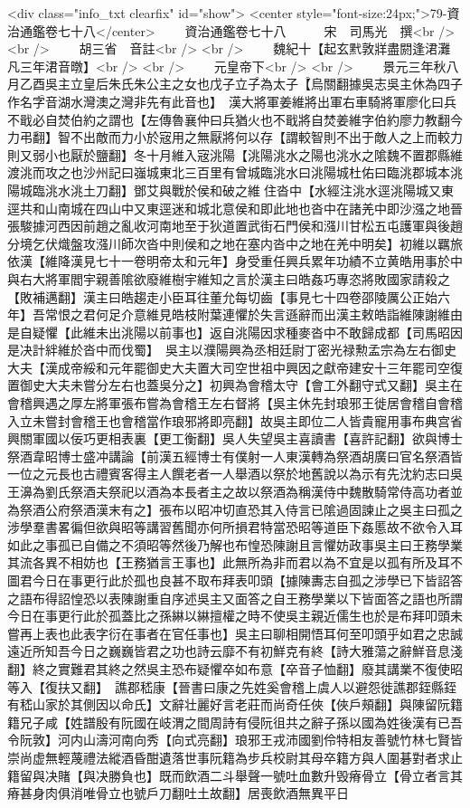 <div class="info_txt clearfix" id="show">
<center style="font-size:24px;">79-資治通鑑卷七十八</center>
  　　資治通鑑卷七十八　　　宋　司馬光　撰<br />
<br />
　　胡三省　音註<br />
<br />
　　魏紀十【起玄黓敦牂盡閼逢涒灘凡三年涒音暾】<br />
<br />
　　元皇帝下<br />
<br />
　　景元三年秋八月乙酉吳主立皇后朱氏朱公主之女也戊子立子為太子【烏關翻據吳志吳主休為四子作名字音湖水灣澳之灣非先有此音也】　漢大將軍姜維將出軍右車騎將軍廖化曰兵不戢必自焚伯約之謂也【左傳魯襄仲曰兵猶火也不戢將自焚姜維字伯約廖力教翻今力弔翻】智不出敵而力小於宼用之無厭將何以存【謂較智則不出于敵人之上而較力則又弱小也厭於鹽翻】冬十月維入宼洮陽【洮陽洮水之陽也洮水之隂魏不置郡縣維渡洮而攻之也沙州記曰嵹城東北三百里有曾城臨洮水曰洮陽城杜佑曰臨洮郡城本洮陽城臨洮水洮土刀翻】鄧艾與戰於侯和破之維住沓中【水經注洮水逕洮陽城又東逕共和山南城在四山中又東逕迷和城北意侯和即此地也沓中在諸羌中即沙漒之地晉張駿據河西因前趙之亂收河南地至于狄道置武街石門侯和漒川甘松五屯護軍與後趙分境乞伏熾盤攻漒川師次沓中則侯和之地在塞内沓中之地在羌中明矣】初維以羈旅依漢【維降漢見七十一卷明帝太和元年】身受重任興兵累年功績不立黄皓用事於中與右大將軍閻宇親善隂欲廢維樹宇維知之言於漢主曰皓姦巧專恣將敗國家請殺之【敗補邁翻】漢主曰皓趨走小臣耳往董允每切齒【事見七十四卷邵陵厲公正始六年】吾常恨之君何足介意維見皓枝附葉連懼於失言遜辭而出漢主敕皓詣維陳謝維由是自疑懼【此維未出洮陽以前事也】返自洮陽因求種麥沓中不敢歸成都【司馬昭因是决計絆維於沓中而伐蜀】　吳主以濮陽興為丞相廷尉丁密光禄勲孟宗為左右御史大夫【漢成帝綏和元年罷御史大夫置大司空世祖中興因之獻帝建安十三年罷司空復置御史大夫未嘗分左右也蓋吳分之】初興為會稽太守【會工外翻守式又翻】吳主在會稽興遇之厚左將軍張布嘗為會稽王左右督將【吳主休先封琅邪王徙居會稽自會稽入立未嘗封會稽王也會稽當作琅邪將即亮翻】故吳主即位二人皆貴寵用事布典宫省興關軍國以佞巧更相表裏【更工衡翻】吳人失望吳主喜讀書【喜許記翻】欲與博士祭酒韋昭博士盛冲講論【前漢五經博士有僕射一人東漢轉為祭酒胡廣曰官名祭酒皆一位之元長也古禮賓客得主人饌老者一人舉酒以祭於地舊說以為示有先沈約志曰吳王濞為劉氏祭酒夫祭祀以酒為本長者主之故以祭酒為稱漢侍中魏散騎常侍高功者並為祭酒公府祭酒漢末有之】張布以昭冲切直恐其入侍言已隂過固諫止之吳主曰孤之涉學羣書畧徧但欲與昭等講習舊聞亦何所損君特當恐昭等道臣下姦慝故不欲令入耳如此之事孤已自備之不須昭等然後乃解也布惶恐陳謝且言懼妨政事吳主曰王務學業其流各異不相妨也【王務猶言王事也】此無所為非而君以為不宜是以孤有所及耳不圖君今日在事更行此於孤也良甚不取布拜表叩頭【據陳夀志自孤之涉學已下皆詔答之語布得詔惶恐以表陳謝重自序述吳主又面答之自王務學業以下皆面答之語也所謂今日在事更行此於孤蓋比之孫綝以綝擅權之時不使吳主親近儒生也於是布拜叩頭未嘗再上表也此表字衍在事者在官任事也】吳主曰聊相開悟耳何至叩頭乎如君之忠誠遠近所知吾今日之巍巍皆君之功也詩云靡不有初鮮克有終【詩大雅蕩之辭鮮音息淺翻】終之實難君其終之然吳主恐布疑懼卒如布意【卒音子恤翻】廢其講業不復使昭等入【復扶又翻】　譙郡嵇康【晉書曰康之先姓奚會稽上虞人以避怨徙譙郡銍縣銍有嵇山家於其側因以命氏】文辭壮麗好言老莊而尚奇任俠【俠戶頰翻】與陳留阮籍籍兄子咸【姓譜殷有阮國在岐渭之間周詩有侵阮徂共之辭子孫以國為姓後漢有已吾令阮敦】河内山濤河南向秀【向式亮翻】琅邪王戎沛國劉伶特相友善號竹林七賢皆崇尚虚無輕蔑禮法縱酒昏酣遺落世事阮籍為步兵校尉其母卒籍方與人圍碁對者求止籍留與决賭【與决勝負也】既而飲酒二斗舉聲一號吐血數升毁瘠骨立【骨立者言其瘠甚身肉俱消唯骨立也號戶刀翻吐土故翻】居喪飲酒無異平日